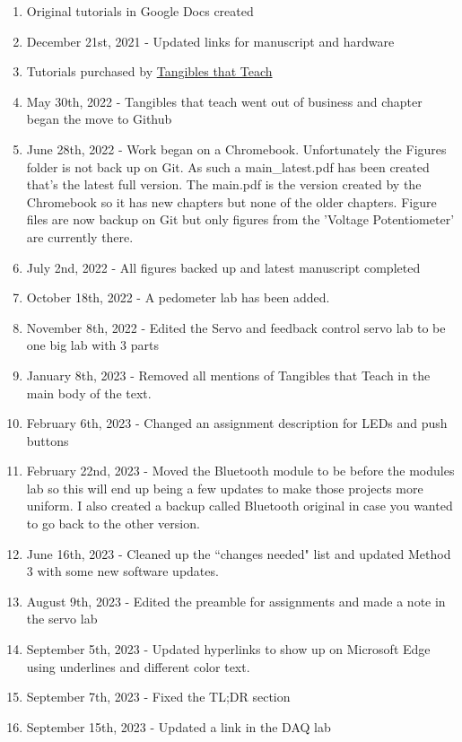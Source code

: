 \documentclass{article}
\begin{document}
\begin{enumerate}[itemsep=-5pt]
\item Original tutorials in Google Docs created
\item December 21st, 2021 - Updated links for manuscript and hardware
\item Tutorials purchased by \href{https://tangibles-that-teach.gitbook.io/instrumentation-lab-manual/-MbMx70LQzRmEG_hS7Ld/}{Tangibles that Teach}
\item May 30th, 2022 - Tangibles that teach went out of business and
  chapter began the move to Github
\item June 28th, 2022 - Work began on a Chromebook. Unfortunately the
  Figures folder is not back up on Git. As such a main\_latest.pdf has
  been created that's the latest full version. The main.pdf is the
  version created by the Chromebook so it has new chapters but none of
  the older chapters. Figure files are now backup on Git but only
  figures from the 'Voltage Potentiometer' are currently there.
\item July 2nd, 2022 - All figures backed up and latest manuscript completed
\item October 18th, 2022 - A pedometer lab has been added.
\item November 8th, 2022 - Edited the Servo and feedback control servo
  lab to be one big lab with 3 parts
\item January 8th, 2023 - Removed all mentions of Tangibles that Teach
  in the main body of the text.
\item February 6th, 2023 - Changed an assignment description for LEDs
  and push buttons
\item February 22nd, 2023 - Moved the Bluetooth module to be before
  the modules lab so this will end up being a few updates to make
  those projects more uniform. I also created a backup called
  Bluetooth original in case you wanted to go back to the other version.
\item June 16th, 2023 - Cleaned up the ``changes needed" list and updated Method 3 with some new software updates.
\item August 9th, 2023 - Edited the preamble for assignments and made a note in the servo lab
\item September 5th, 2023 - Updated hyperlinks to show up on Microsoft Edge using underlines and different color text.
\item September 7th, 2023 - Fixed the TL;DR section
\item September 15th, 2023 - Updated a link in the DAQ lab

\end{enumerate}
\end{document}
